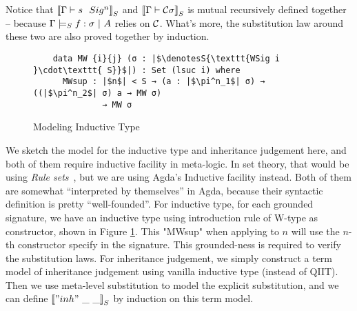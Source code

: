 Notice that $\denotesS{\goodSig{\Gamma}{s}{n}}$ and $\denotesS{\goodType{\Gamma}{\cC\sigma}{i}}$ is mutual recursively defined together -- because $\goodSealS{\Gamma}{f}{\sigma}{A}$ relies on $\cC$. What's more, the substitution law around these two are also proved together by induction.

\begin{figure}
  \centering
\begin{minipage}{0.8\linewidth}
  \begin{verbatim}
    data MW {i}{j} (σ : |$\denotesS{\texttt{WSig i }\cdot\texttt{ S}}$|) : Set (lsuc i) where
      MWsup : |$n$| < S → (a : |$\pi^n_1$| σ) → ((|$\pi^n_2$| σ) a → MW σ) 
              → MW σ
      \end{verbatim}
\end{minipage}
\caption{Modeling Inductive Type}\label{fig:model-ind-type}
\end{figure}

We sketch the model for the inductive type and inheritance judgement here, and both of them require inductive facility in meta-logic. In set theory, that would be using \textit{Rule sets}~\citep{timany2017consistency,aczel1998relating}, but we are using Agda's Inductive facility instead. Both of them are somewhat ``interpreted by themselves'' in Agda, because their syntactic definition is pretty ``well-founded''. For inductive type, for each grounded signature, we have an inductive type using introduction rule of W-type as constructor, shown in Figure \ref*{fig:model-ind-type}. This "MWsup" when applying to $n$ will use the $n$-th constructor specify in the signature. This grounded-ness is required to verify the substitution laws. For inheritance judgement, we simply construct a term model of inheritance judgement using vanilla inductive type (instead of QIIT). Then we use meta-level substitution to model the explicit substitution, and we can define $\denotesS{"inh"~\_ ~\_}$ by induction on this term model. 



